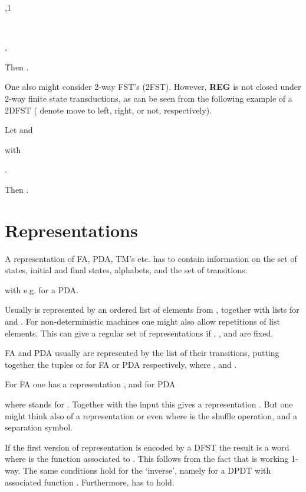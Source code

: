 \documentclass{eptcs}
\begin{document}
{{{\hspace{1cm}},1{\

\hspace{1cm}

\hspace{1cm}

\hspace{1cm}},{\.

Then .

\bigskip

One also might consider 2-way FST's (2FST). However, {\bf REG} is not closed
under 2-way finite state transductions, as can be seen from the following
example of a 2DFST ( denote move to left, right, or not,
respectively).

\noindent
Let  and


with



\hspace{1cm}

\hspace{1cm}.

Then .

\bigskip


\section{Representations}

A representation of FA, PDA, TM's etc. has to contain information on the
set of states, initial and final states, alphabets, and the set of transitions:

 with e.g. 
 for a PDA.

\noindent
Usually  is represented by an ordered list of elements from , together with
lists for  and . For non-deterministic machines one might also allow
repetitions of list elements. This can give a regular set of representations if
, , and  are fixed.

FA and PDA usually are represented by the list  of their transitions,
putting together the tuples  or  for FA or PDA
respectively, where , and
.

For FA one has a representation , and for PDA

where  stands for .
Together with the input  this gives a representation .
But one might think also of a representation  or even
 where  is the shuffle operation,
and  a separation symbol.

If the first version of representation is encoded by a DFST  the result is a word
 where  is the function associated to . 
This follows from the fact that  is working 1-way.
The same conditions hold for the `inverse', namely for a DPDT  with
associated function . Furthermore,
 has to hold.

}}}
\end{document}
